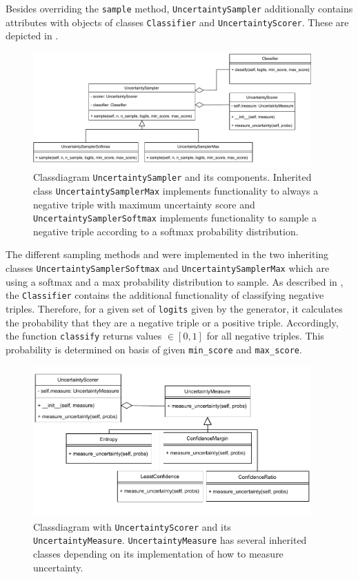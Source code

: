 Besides overriding the \texttt{sample} method, \texttt{UncertaintySampler} additionally contains attributes with objects of classes \texttt{Classifier} and \texttt{UncertaintyScorer}.
These are depicted in .
\begin{figure}[t]
  \centering
    \includegraphics[width=0.95\textwidth]{figures/classdiagrams/UncertaintySampler.pdf}
    \caption{Classdiagram \texttt{UncertaintySampler} and its components.
    Inherited class \texttt{UncertaintySamplerMax} implements functionality to always a negative triple with maximum uncertainty score and \texttt{UncertaintySamplerSoftmax} implements functionality to sample a negative triple according to a softmax probability distribution.}
  \label{fig:uncertainty_sampler}
\end{figure}
The different sampling methods \usmax and \ussoftmax were implemented in the two inheriting classes \texttt{UncertaintySamplerSoftmax} and \texttt{UncertaintySamplerMax} which are using a softmax and a max probability distribution to sample.
As described in , the \texttt{Classifier} contains the additional functionality of classifying negative triples.
Therefore, for a given set of \texttt{logits} given by the generator, it calculates the probability that they are a negative triple or a positive triple.
Accordingly, the function \texttt{classify} returns values $\in [0,1]$ for all negative triples.
This probability is determined on basis of given \texttt{min\_score} and \texttt{max\_score}.
\begin{figure}[H]
  \centering
    \includegraphics[width=0.95\textwidth]{figures/classdiagrams/UncertaintyScorer.pdf}
  \caption{Classdiagram with \texttt{UncertaintyScorer} and its \texttt{UncertaintyMeasure}.
  \texttt{UncertaintyMeasure} has several inherited classes depending on its implementation of how to measure uncertainty.}
  \label{fig:uncertainty_measures}
\end{figure}
